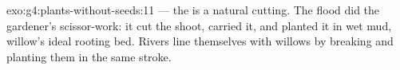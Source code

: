 \begin{solution}{exo:g4:plants-without-seeds:11}
 --- the  is a natural cutting.
The flood did the gardener's scissor-work: it cut the shoot,
carried it, and planted it in wet mud, willow's ideal rooting
bed. Rivers line themselves with willows by breaking and
planting them in the same stroke.
\end{solution}
